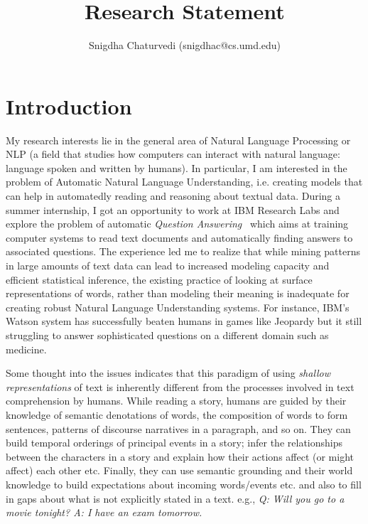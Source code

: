 \documentclass[9.8pt, twocolumn]{article}
\title{Research Statement}
\author{Snigdha Chaturvedi (snigdhac@cs.umd.edu)}
\date{}
\begin{document}
\maketitle

\section{Introduction}
My research interests lie in the general area of Natural Language Processing or NLP (a field that studies how computers can interact with natural language: language spoken and written by humans). In particular, I am interested in the problem of Automatic Natural Language Understanding, i.e. creating models that can help in automatedly reading and reasoning about textual data. %
During a summer internship, I got an opportunity to work at IBM Research Labs and explore the problem of automatic \emph{Question Answering}~\cite{QAWWW} which aims at training computer systems to read text documents and automatically finding answers to associated questions. 
The experience led me to realize that while mining patterns in large amounts of text data can lead to increased modeling capacity and efficient statistical inference, the existing practice of looking at surface representations of words, rather than modeling their meaning is inadequate for creating robust Natural Language Understanding systems.
For instance, IBM's Watson system has successfully beaten humans in games like Jeopardy but it still struggling to answer sophisticated questions on a different domain such as medicine.

Some thought into the issues indicates that this paradigm of using \emph{shallow representations} of text is inherently different from the processes involved in text comprehension by humans. While reading a story, humans are guided by their knowledge of semantic denotations of words, the composition of words to form sentences, patterns of discourse narratives in a paragraph, and so on. 
They can build temporal orderings of principal events in a story; infer the relationships between the characters in a story and explain how their actions affect (or might affect) each other etc. Finally, they can use semantic grounding and their world knowledge to build expectations about incoming words/events etc. and also to fill in gaps about what is not explicitly stated in a text. e.g., \emph{Q: Will you go to a movie tonight? A: I have an exam tomorrow.} 
\end{document}
